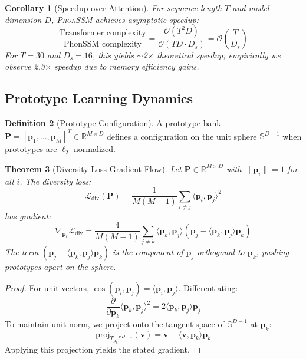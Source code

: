 \documentclass[sigconf,nonacm,anonymous]{acmart}
\newtheorem{theorem}{Theorem}[section]
\newtheorem{corollary}[theorem]{Corollary}
\theoremstyle{definition}
\newtheorem{definition}[theorem]{Definition}
\theoremstyle{remark}
\newcommand{\phonssm}{\textsc{PhonSSM}}
\begin{document}
\begin{corollary}[Speedup over Attention]
For sequence length $T$ and model dimension $D$, \phonssm{} achieves asymptotic speedup:
\begin{equation}
\frac{\text{Transformer complexity}}{\text{PhonSSM complexity}} = \frac{\mathcal{O}(T^2 D)}{\mathcal{O}(TD \cdot D_s)} = \mathcal{O}\left(\frac{T}{D_s}\right)
\end{equation}
For $T=30$ and $D_s=16$, this yields $\sim$2$\times$ theoretical speedup; empirically we observe 2.3$\times$ speedup due to memory efficiency gains.
\end{corollary}

\subsection{Prototype Learning Dynamics}

\begin{definition}[Prototype Configuration]
A prototype bank $\mathbf{P} = [\mathbf{p}_1, \ldots, \mathbf{p}_M]^T \in \mathbb{R}^{M \times D}$ defines a configuration on the unit sphere $\mathbb{S}^{D-1}$ when prototypes are $\ell_2$-normalized.
\end{definition}

\begin{theorem}[Diversity Loss Gradient Flow]
\label{thm:diversity}
Let $\mathbf{P} \in \mathbb{R}^{M \times D}$ with $\|\mathbf{p}_i\| = 1$ for all $i$. The diversity loss:
\begin{equation}
\mathcal{L}_{\text{div}}(\mathbf{P}) = \frac{1}{M(M-1)} \sum_{i \neq j} \langle \mathbf{p}_i, \mathbf{p}_j \rangle^2
\end{equation}
has gradient:
\begin{equation}
\nabla_{\mathbf{p}_k} \mathcal{L}_{\text{div}} = \frac{4}{M(M-1)} \sum_{j \neq k} \langle \mathbf{p}_k, \mathbf{p}_j \rangle \left( \mathbf{p}_j - \langle \mathbf{p}_k, \mathbf{p}_j \rangle \mathbf{p}_k \right)
\end{equation}
The term $(\mathbf{p}_j - \langle \mathbf{p}_k, \mathbf{p}_j \rangle \mathbf{p}_k)$ is the component of $\mathbf{p}_j$ orthogonal to $\mathbf{p}_k$, pushing prototypes apart on the sphere.
\end{theorem}

\begin{proof}
For unit vectors, $\cos(\mathbf{p}_i, \mathbf{p}_j) = \langle \mathbf{p}_i, \mathbf{p}_j \rangle$. Differentiating:
\begin{equation}
\frac{\partial}{\partial \mathbf{p}_k} \langle \mathbf{p}_k, \mathbf{p}_j \rangle^2 = 2 \langle \mathbf{p}_k, \mathbf{p}_j \rangle \mathbf{p}_j
\end{equation}
To maintain unit norm, we project onto the tangent space of $\mathbb{S}^{D-1}$ at $\mathbf{p}_k$:
\begin{equation}
\text{proj}_{T_{\mathbf{p}_k}\mathbb{S}^{D-1}}(\mathbf{v}) = \mathbf{v} - \langle \mathbf{v}, \mathbf{p}_k \rangle \mathbf{p}_k
\end{equation}
Applying this projection yields the stated gradient.
\end{proof}
\end{document}
